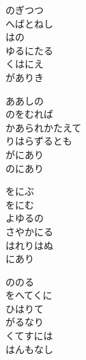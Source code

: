 \documentclass[10pt,b5j]{tarticle} %
\begin{document}
\vspace{1.5em} %
\newcommand{\linespace}{0.5em} %
\newcommand{\blocksize}{0.5\hsize} %
\begin{enumerate} %
    \begin{minipage}[c]{\blocksize}
    
        \vspace{\linespace}
        \item
        のぎつつ\\
        へばとねし\\
        はの\\
        ゆるにたる\\
        くはにえ\\
        がありき
        
        \vspace{\linespace}
        \item
        ああしの\\
        のをむれば\\
        かあられかたえて\\
        りはらずるとも\\
        がにあり\\
        のにあり
        
        \vspace{\linespace}
        \item
        をにぶ\\
        をにむ\\
        よゆるの\\
        さやかにる\\
        はれりはぬ\\
        にあり
        
        \vspace{\linespace}
        \item
        ののる\\
        をへてくに\\
        ひはりて\\
        がるなり\\
        くてすには\\
        はんもなし
        

\end{minipage}
\end{enumerate}
\end{document}
